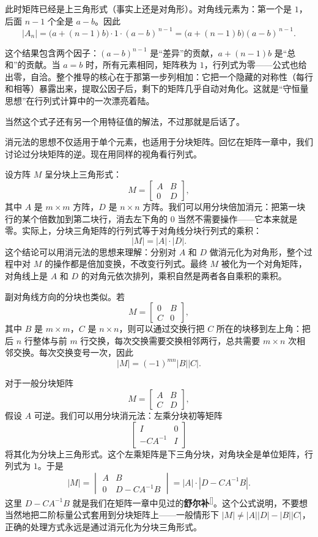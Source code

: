 \documentclass[UTF8]{ctexbook}
\begin{document}
此时矩阵已经是上三角形式（事实上还是对角形）。对角线元素为：第一个是 $1$，后面 $n-1$ 个全是 $a-b$。因此
\[
|A_n|=\bigl(a+(n-1)b\bigr)\cdot 1\cdot(a-b)^{\,n-1}
=\bigl(a+(n-1)b\bigr)(a-b)^{\,n-1}.
\]

这个结果包含两个因子：$(a-b)^{n-1}$ 是“差异”的贡献，$a+(n-1)b$ 是“总和”的贡献。当 $a=b$ 时，所有元素相同，矩阵秩为 $1$，行列式为零——公式也给出零，自洽。整个推导的核心在于那第一步列相加：它把一个隐藏的对称性（每行和相等）暴露出来，提取公因子后，剩下的矩阵几乎自动对角化。这就是“守恒量思想”在行列式计算中的一次漂亮着陆。

当然这个式子还有另一个用特征值的解法\label{rank_one_correction_determinant_conservation}\pageref{rank_one_correction_determinant_eigenvalue}，不过那就是后话了。


消元法的思想不仅适用于单个元素，也适用于分块矩阵。回忆在矩阵一章中，我们讨论过分块矩阵的逆。现在用同样的视角看行列式。

设方阵 $M$ 呈分块上三角形式：
\[
M=\begin{bmatrix}
A & B\\
0 & D
\end{bmatrix},
\]
其中 $A$ 是 $m\times m$ 方阵，$D$ 是 $n\times n$ 方阵。我们可以用分块倍加消元：把第一块行的某个倍数加到第二块行，消去左下角的 $0$ 当然不需要操作——它本来就是零。实际上，分块三角矩阵的行列式等于对角线分块行列式的乘积：
\[
|M|=|A|\cdot|D|.
\]
这个结论可以用消元法的思想来理解：分别对 $A$ 和 $D$ 做消元化为对角形，整个过程中对 $M$ 的操作都是倍加变换，不改变行列式。最终 $M$ 被化为一个对角矩阵，对角线上是 $A$ 和 $D$ 的对角元依次排列，乘积自然是两者各自乘积的乘积。

副对角线方向的分块也类似。若
\[
M=\begin{bmatrix}
0 & B\\
C & 0
\end{bmatrix},
\]
其中 $B$ 是 $m\times m$，$C$ 是 $n\times n$，则可以通过交换行把 $C$ 所在的块移到左上角：把后 $n$ 行整体与前 $m$ 行交换，每次交换需要交换相邻两行，总共需要 $m\times n$ 次相邻交换。每次交换变号一次，因此
\[
|M|=(-1)^{mn}|B||C|.
\]

对于一般分块矩阵
\[
M=\begin{bmatrix}
A & B\\
C & D
\end{bmatrix},
\]
假设 $A$ 可逆。我们可以用分块消元法：左乘分块初等矩阵
\[
\begin{bmatrix}
I & 0\\
-CA^{-1} & I
\end{bmatrix}
\]
将其化为分块上三角形式。这个左乘矩阵是下三角分块，对角块全是单位矩阵，行列式为 $1$。于是
\[
|M|=\begin{vmatrix}
A & B\\
0 & D-CA^{-1}B
\end{vmatrix}
=|A|\cdot|D-CA^{-1}B|.
\]
这里 $D-CA^{-1}B$ 就是我们在矩阵一章中见过的\textbf{舒尔补}\textsuperscript{[\pageref{matrixSchur}]}\label{determinantSchur}。这个公式说明，不要想当然地把二阶标量公式套用到分块矩阵上——一般情形下 $|M|\neq|A||D|-|B||C|$，正确的处理方式永远是通过消元化为分块三角形式。
\end{document}
